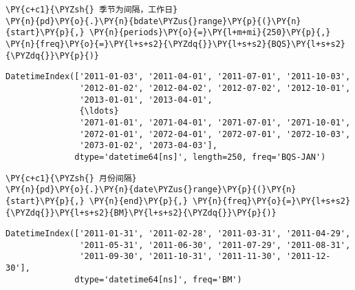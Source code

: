     \begin{tcolorbox}[breakable, size=fbox, boxrule=1pt, pad at break*=1mm,colback=cellbackground, colframe=cellborder]
\begin{Verbatim}[commandchars=\\\{\}]
\PY{c+c1}{\PYZsh{} 季节为间隔，工作日}
\PY{n}{pd}\PY{o}{.}\PY{n}{bdate\PYZus{}range}\PY{p}{(}\PY{n}{start}\PY{p}{,} \PY{n}{periods}\PY{o}{=}\PY{l+m+mi}{250}\PY{p}{,} \PY{n}{freq}\PY{o}{=}\PY{l+s+s2}{\PYZdq{}}\PY{l+s+s2}{BQS}\PY{l+s+s2}{\PYZdq{}}\PY{p}{)}
\end{Verbatim}
\end{tcolorbox}

            \begin{tcolorbox}[breakable, size=fbox, boxrule=.5pt, pad at break*=1mm, opacityfill=0]
\begin{Verbatim}[commandchars=\\\{\}]
DatetimeIndex(['2011-01-03', '2011-04-01', '2011-07-01', '2011-10-03',
               '2012-01-02', '2012-04-02', '2012-07-02', '2012-10-01',
               '2013-01-01', '2013-04-01',
               {\ldots}
               '2071-01-01', '2071-04-01', '2071-07-01', '2071-10-01',
               '2072-01-01', '2072-04-01', '2072-07-01', '2072-10-03',
               '2073-01-02', '2073-04-03'],
              dtype='datetime64[ns]', length=250, freq='BQS-JAN')
\end{Verbatim}
\end{tcolorbox}
        
    \begin{tcolorbox}[breakable, size=fbox, boxrule=1pt, pad at break*=1mm,colback=cellbackground, colframe=cellborder]
\begin{Verbatim}[commandchars=\\\{\}]
\PY{c+c1}{\PYZsh{} 月份间隔}
\PY{n}{pd}\PY{o}{.}\PY{n}{date\PYZus{}range}\PY{p}{(}\PY{n}{start}\PY{p}{,} \PY{n}{end}\PY{p}{,} \PY{n}{freq}\PY{o}{=}\PY{l+s+s2}{\PYZdq{}}\PY{l+s+s2}{BM}\PY{l+s+s2}{\PYZdq{}}\PY{p}{)}
\end{Verbatim}
\end{tcolorbox}

            \begin{tcolorbox}[breakable, size=fbox, boxrule=.5pt, pad at break*=1mm, opacityfill=0]
\begin{Verbatim}[commandchars=\\\{\}]
DatetimeIndex(['2011-01-31', '2011-02-28', '2011-03-31', '2011-04-29',
               '2011-05-31', '2011-06-30', '2011-07-29', '2011-08-31',
               '2011-09-30', '2011-10-31', '2011-11-30', '2011-12-30'],
              dtype='datetime64[ns]', freq='BM')
\end{Verbatim}
\end{tcolorbox}
        
